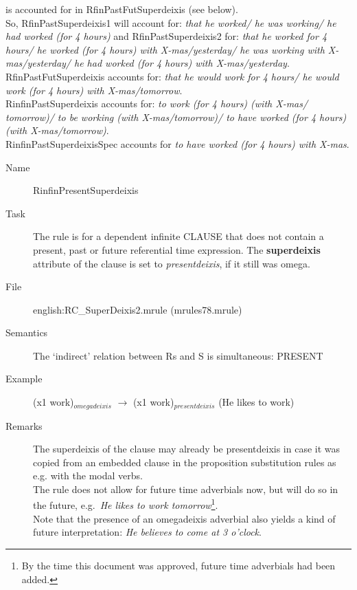 \begin{description}
\begin{description}
is accounted for in RfinPastFutSuperdeixis (see below).\\
So, RfinPastSuperdeixis1 will account for: {\em that he worked/ he was working/
he had worked (for 4 hours)} and RfinPastSuperdeixis2 for: {\em that he worked 
for 4 hours/ he worked (for 4 hours) with X-mas/yesterday/ he was working with 
X-mas/yesterday/ he had worked (for 4 hours) with X-mas/yesterday}.\\
RfinPastFutSuperdeixis accounts for: {\em that he would work for 4 hours/ he 
would work (for 4 hours) with X-mas/tomorrow}.\\
RinfinPastSuperdeixis accounts for: {\em to work (for 4 hours) (with X-mas/
tomorrow)/ to be working (with X-mas/tomorrow)/ to have worked (for 4 hours)
(with X-mas/tomorrow)}.\\
RinfinPastSuperdeixisSpec accounts for {\em to have worked (for 4 hours) with 
X-mas}.

\end{description}

\vspace{1 cm}
\begin{description}
\item[Name]   RinfinPresentSuperdeixis
\item[Task] The rule is for a dependent infinite CLAUSE that does not contain 
a present, past or future referential time expression. 
The {\bf superdeixis} attribute of the clause is set to {\em presentdeixis\/}, 
if it still was omega. 
\item[File] english:RC\_SuperDeixis2.mrule (mrules78.mrule)
\item[Semantics] The `indirect' relation between Rs and S is simultaneous: PRESENT
\item[Example]
(x1 work)$_{omegadeixis}$ $\rightarrow$ (x1 work)$_{presentdeixis}$ (He likes
to work)
\item[Remarks] 
The superdeixis of the clause may already be  presentdeixis in 
case it was copied from an embedded  clause in the proposition substitution 
rules as e.g. with the modal verbs. \\
The rule does not allow for future time adverbials now, but will do so in the 
future, e.g.\ {\em He likes to work tomorrow\/}\footnote{By the time this 
document was approved, future time adverbials had been added.}.\\
Note that the presence of  an omegadeixis adverbial also yields a kind of future 
interpretation: {\em He believes to come at 3 o'clock}.
\end{description}


\end{description}
